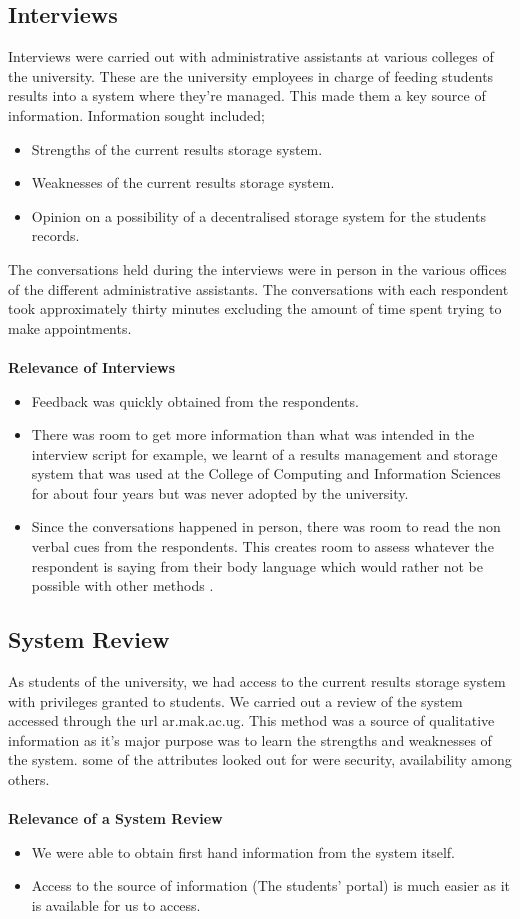 \subsection{Interviews}
Interviews were carried out with administrative assistants at various colleges of the university. These are the university employees in charge of feeding students results into a system where they're managed. This made them a key source of information. Information sought included;
\begin{itemize}
\item Strengths of the current results storage system.
\item Weaknesses of the current results storage system.
\item Opinion on a possibility of a decentralised storage system for the students records.
\end{itemize}
The conversations held during the interviews were in person in the various offices of the different administrative assistants. The conversations with each respondent took approximately thirty minutes excluding the amount of time spent trying to make appointments.\\~\\
\textbf{Relevance of Interviews}
\begin{itemize}
\item Feedback was quickly obtained from the respondents.
\item There was room to get more information than what was intended in the interview script for example, we learnt of a results management and storage system that was used at the College of Computing and Information Sciences for about four years but was never adopted by the university.
\item Since the conversations happened in person, there was room to read the non verbal cues from the respondents. This creates room to assess whatever the respondent is saying from their body language which would rather not be possible with other methods \cite{17}.
\end{itemize}

\subsection{System Review}
As students of the university, we had access to the current results storage system with privileges granted to students. We carried out a review of the system accessed through the url ar.mak.ac.ug. This method was a source of qualitative information as it's major purpose was to learn the strengths and weaknesses of the system. some of the attributes looked out for were security, availability among others.\\~\\
\textbf{Relevance of a System Review}
\begin{itemize}
\item We were able to obtain first hand information from the system itself.
\item Access to the source of information (The students' portal) is much easier as it is available for us to access.
\end{itemize}


